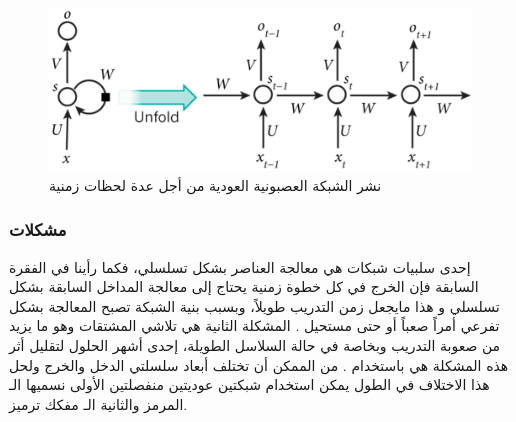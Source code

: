 \begin{figure}[h!]
	\centerline{\includegraphics[width=\textwidth]{images/RNN_unfold}}
	\caption{
		نشر الشبكة العصبونية العودية
		من أجل عدة لحظات زمنية
		}
	\label{fig:RNN3}
\end{figure}
\newline
\subsubsection{مشكلات 
}
إحدى سلبيات شبكات
 هي معالجة العناصر بشكل تسلسلي، فكما رأينا في الفقرة السابقة فإن الخرج في كل خطوة زمنية يحتاج إلى معالجة المداخل السابقة بشكل تسلسلي و هذا مايجعل زمن التدريب طويلاً، وبسبب بنية الشبكة تصبح المعالجة بشكل تفرعي أمراً صعباً أو حتى مستحيل
.
المشكلة الثانية هي تلاشي المشتقات
وهو ما يزيد من صعوبة التدريب وبخاصة في حالة السلاسل الطويلة، إحدى أشهر الحلول لتقليل أثر هذه المشكلة هي باستخدام
.
من الممكن أن تختلف أبعاد سلسلتي الدخل والخرج ولحل هذا الاختلاف في الطول يمكن استخدام شبكتين عوديتين منفصلتين الأولى نسميها الـ
المرمز والثانية الـ
مفكك ترميز.
